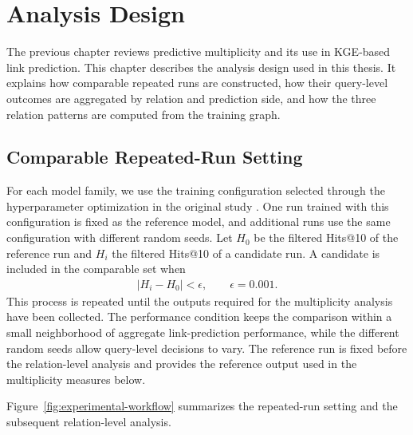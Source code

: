 \section{Analysis Design}
\label{chap:framework}

The previous chapter reviews predictive multiplicity and its use in KGE-based
link prediction. This chapter describes the analysis design used in this
thesis. It explains how comparable repeated runs are constructed, how their
query-level outcomes are aggregated by relation and prediction side, and how
the three relation patterns are computed from the training graph.

\subsection{Comparable Repeated-Run Setting}

For each model family, we use the training configuration selected through the
hyperparameter optimization in the original study
\citep{zhu2024predictive}. One run trained with this configuration is fixed as
the reference model, and additional runs use the same configuration with
different random seeds. Let $H_0$ be the filtered Hits@10 of the reference run
and $H_i$ the filtered Hits@10 of a candidate run. A candidate is included in
the comparable set when
\begin{align}
    |H_i-H_0| < \epsilon,
    \qquad \epsilon=0.001.
\end{align}
This process is repeated until the outputs required for the multiplicity
analysis have been collected. The performance condition keeps the comparison
within a small neighborhood of aggregate link-prediction performance, while
the different random seeds allow query-level decisions to vary. The reference
run is fixed before the relation-level analysis and provides the reference
output used in the multiplicity measures below.

Figure~\ref{fig:experimental-workflow} summarizes the repeated-run setting and
the subsequent relation-level analysis.

